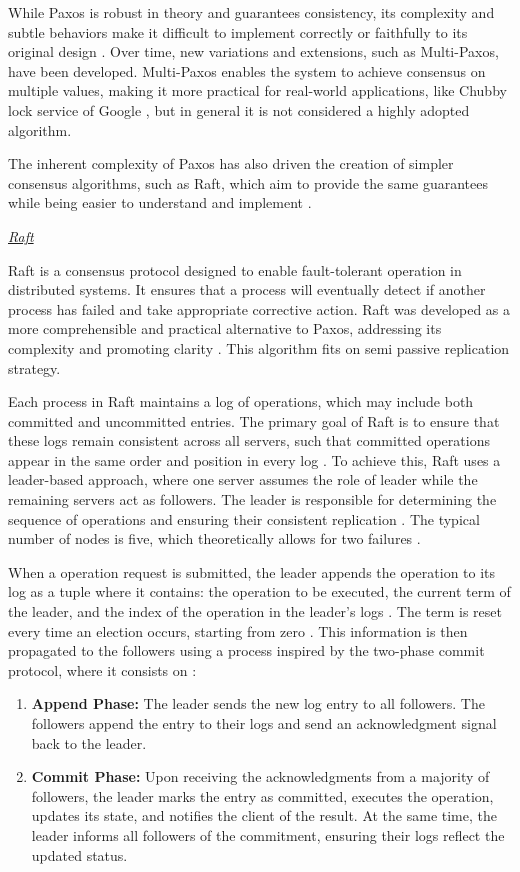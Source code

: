 While Paxos is robust in theory and guarantees consistency, its complexity and subtle behaviors make it difficult to implement correctly or faithfully to its original design \cite{Tanenbaum2023}. Over time, new variations and extensions, such as Multi-Paxos, have been developed. Multi-Paxos enables the system to achieve consensus on multiple values, making it more practical for real-world applications, like Chubby lock service of Google \cite{Coulouris2012}, but in general it is not considered a highly adopted algorithm.

The inherent complexity of Paxos has also driven the creation of simpler consensus algorithms, such as Raft, which aim to provide the same guarantees while being easier to understand and implement \cite{Tanenbaum2023, Howard2020}.

\textit{\underline{Raft}}

Raft is a consensus protocol designed to enable fault-tolerant operation in distributed systems. It ensures that a process will eventually detect if another process has failed and take appropriate corrective action. Raft was developed as a more comprehensible and practical alternative to Paxos, addressing its complexity and promoting clarity \cite{raft-diego,Tanenbaum2023}. This algorithm fits on semi passive replication strategy.

Each process in Raft maintains a log of operations, which may include both committed and uncommitted entries. The primary goal of Raft is to ensure that these logs remain consistent across all servers, such that committed operations appear in the same order and position in every log \cite{Tanenbaum2023}. To achieve this, Raft uses a leader-based approach, where one server assumes the role of leader while the remaining servers act as followers. The leader is responsible for determining the sequence of operations and ensuring their consistent replication \cite{Vitillo2021}. The typical number of nodes is five, which theoretically allows for two failures \cite{raft-diego}.

When a operation request is submitted, the leader appends the operation to its log as a tuple where it contains: the operation to be executed, the current term of the leader, and the index of the operation in the leader's logs \cite{Tanenbaum2023}. The term is reset every time an election occurs, starting from zero \cite{raft-diego}. This information is then propagated to the followers using a process inspired by the two-phase commit protocol, where it consists on \cite{Tanenbaum2023,Vitillo2021}:
\begin{enumerate}
    \item \textbf{Append Phase:} The leader sends the new log entry to all followers. The followers append the entry to their logs and send an acknowledgment signal back to the leader.
    \item \textbf{Commit Phase:} Upon receiving the acknowledgments from a majority of followers, the leader marks the entry as committed, executes the operation, updates its state, and notifies the client of the result. At the same time, the leader informs all followers of the commitment, ensuring their logs reflect the updated status.
\end{enumerate}

